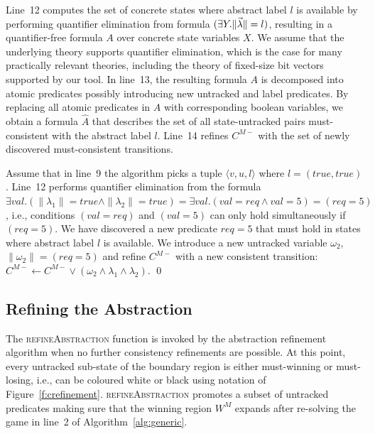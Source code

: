 Line~12 computes the set of concrete states where abstract label $l$ is available by performing quantifier elimination from formula $(\exists Y.\|\vec{\lambda}\|=l)$, resulting in a quantifier-free formula $A$ over concrete state variables $X$.  We assume that the underlying theory supports quantifier elimination, which is the case for many practically relevant theories, including the theory of fixed-size bit vectors supported by our tool.  In line~13, the resulting formula $A$ is decomposed into atomic predicates possibly introducing new untracked and label predicates.  By replacing all atomic predicates in $A$ with corresponding boolean variables, we obtain a formula $\hat{A}$ that describes the set of all state-untracked pairs must-consistent with the abstract label $l$.  Line~14 refines $C^{M-}$ with the set of newly discovered must-consistent transitions.


\begin{ex}
    \everymath{\mathtt{\xdef\tmp{\fam\the\fam\relax}\aftergroup\tmp}}
    \everydisplay{\mathtt{\xdef\tmp{\fam\the\fam\relax}\aftergroup\tmp}}
    Assume that in line~9 the algorithm picks a tuple $\langle v,u,l\rangle$ where $l=(true, true)$.  Line~12 performs quantifier elimination from the formula $\exists val. (\|\lambda_1\|=true \land  \|\lambda_2\|=true) = \exists val. (val=req \land val=5) = (req=5)$, i.e., conditions $(val=req)$ and $(val=5)$ can only hold simultaneously if $(req=5)$. We have discovered a new predicate $req=5$ that must hold in states where abstract label $l$ is available.  We introduce a new untracked variable $\omega_2$, $\|\omega_2\|=(req=5)$ and refine $C^{M-}$ with a new consistent transition: $C^{M-} \gets C^{M-} \lor (\omega_2 \land \lambda_1 \land \lambda_2)$.
    \qed
\end{ex}

\subsection{Refining the Abstraction}
\label{sec:refineAbstraction}

The \textsc{refineAbstraction} function is invoked by the abstraction refinement algorithm when no further consistency refinements are possible.  At this point, every untracked sub-state of the boundary region is either must-winning or must-losing, i.e., can be coloured white or black using notation of Figure~\ref{f:crefinement}.  \textsc{refineAbstraction} promotes a subset of untracked predicates making sure that the winning region $W^M$ expands after re-solving the game in line~2 of Algorithm~\ref{alg:generic}.  

